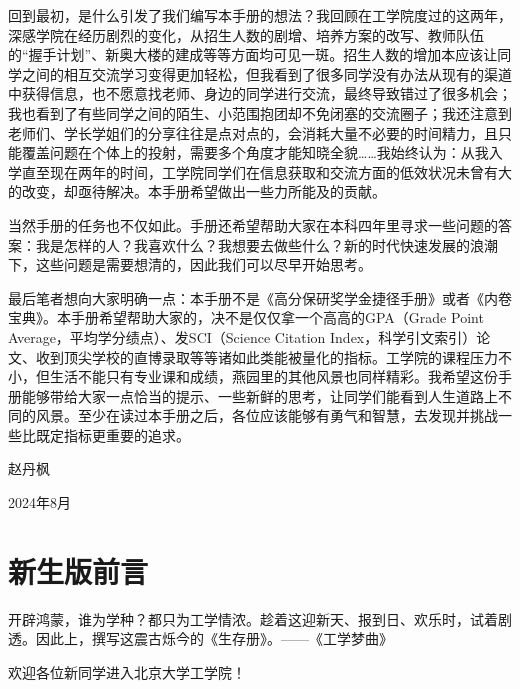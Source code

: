 \documentclass[11pt,oneside]{book}
\begin{document}
\vspace{10pt}

回到最初，是什么引发了我们编写本手册的想法？我回顾在工学院度过的这两年，深感学院在经历剧烈的变化，从招生人数的剧增、培养方案的改写、教师队伍的“握手计划”、新奥大楼的建成等等方面均可见一斑。招生人数的增加本应该让同学之间的相互交流学习变得更加轻松，但我看到了很多同学没有办法从现有的渠道中获得信息，也不愿意找老师、身边的同学进行交流，最终导致错过了很多机会；我也看到了有些同学之间的陌生、小范围抱团却不免闭塞的交流圈子；我还注意到老师们、学长学姐们的分享往往是点对点的，会消耗大量不必要的时间精力，且只能覆盖问题在个体上的投射，需要多个角度才能知晓全貌……我始终认为：从我入学直至现在两年的时间，工学院同学们在信息获取和交流方面的低效状况未曾有大的改变，却亟待解决。本手册希望做出一些力所能及的贡献。

\vspace{10pt}

当然手册的任务也不仅如此。手册还希望帮助大家在本科四年里寻求一些问题的答案：我是怎样的人？我喜欢什么？我想要去做些什么？新的时代快速发展的浪潮下，这些问题是需要想清的，因此我们可以尽早开始思考。

\vspace{10pt}

最后笔者想向大家明确一点：本手册不是《高分保研奖学金捷径手册》或者《内卷宝典》。本手册希望帮助大家的，决不是仅仅拿一个高高的GPA（Grade Point Average，平均学分绩点）、发SCI（Science Citation Index，科学引文索引）论文、收到顶尖学校的直博录取等等诸如此类能被量化的指标。工学院的课程压力不小，但生活不能只有专业课和成绩，燕园里的其他风景也同样精彩。我希望这份手册能够带给大家一点恰当的提示、一些新鲜的思考，让同学们能看到人生道路上不同的风景。至少在读过本手册之后，各位应该能够有勇气和智慧，去发现并挑战一些比既定指标更重要的追求。
\begin{flushright}
    赵丹枫
    
    2024年8月
\end{flushright}

\chapter*{新生版前言}
开辟鸿蒙，谁为学种？都只为工学情浓。趁着这迎新天、报到日、欢乐时，试着剧透。因此上，撰写这震古烁今的《生存册》。——《工学梦曲》

\vspace{10pt}

欢迎各位新同学进入北京大学工学院！

\vspace{10pt}
\end{document}
